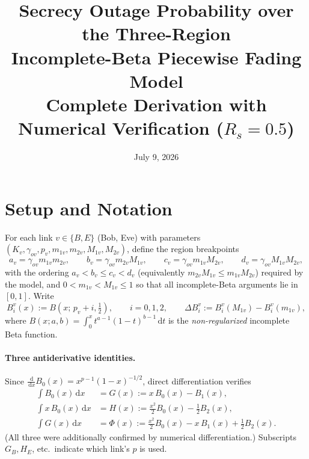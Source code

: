 \documentclass[11pt]{article}
\title{\textbf{Secrecy Outage Probability over the Three-Region\\ Incomplete-Beta Piecewise Fading Model}\\[2mm]
\large Complete Derivation with Numerical Verification ($R_s = 0.5$)}
\author{}
\date{July 9, 2026}
\newcommand{\Binc}[2]{B\!\left(#1;\,#2,\tfrac12\right)}
\newcommand{\dd}{\,\mathrm{d}}
\begin{document}
\maketitle
\vspace{-10mm}
\begin{center}
\end{center}

\section{Setup and Notation}
For each link $v\in\{B,E\}$ (Bob, Eve) with parameters $(K_v,\gamma_{ov},p_v,m_{1v},m_{2v},M_{1v},M_{2v})$, define the region breakpoints
\[
a_v=\gamma_{ov}m_{1v}m_{2v},\qquad
b_v=\gamma_{ov}m_{2v}M_{1v},\qquad
c_v=\gamma_{ov}m_{1v}M_{2v},\qquad
d_v=\gamma_{ov}M_{1v}M_{2v},
\]
with the ordering $a_v<b_v\le c_v<d_v$ (equivalently $m_{2v}M_{1v}\le m_{1v}M_{2v}$) required by the model, and $0<m_{1v}<M_{1v}\le 1$ so that all incomplete-Beta arguments lie in $[0,1]$. Write
\[
B_i^{v}(x):=\Binc{x}{p_v+i},\qquad i=0,1,2,\qquad
\Delta B_i^{v}:=B_i^{v}(M_{1v})-B_i^{v}(m_{1v}),
\]
where $B(x;a,b)=\int_0^x t^{a-1}(1-t)^{b-1}\dd t$ is the \emph{non-regularized} incomplete Beta function.

\paragraph{Three antiderivative identities.} Since $\frac{\dd}{\dd x}B_0(x)=x^{p-1}(1-x)^{-1/2}$, direct differentiation verifies
\begin{align}
\int B_0(x)\dd x &= G(x):= x\,B_0(x)-B_1(x), \label{id:G}\\
\int x\,B_0(x)\dd x &= H(x):= \tfrac{x^2}{2}B_0(x)-\tfrac12 B_2(x), \label{id:H}\\
\int G(x)\dd x &= \Phi(x):= \tfrac{x^2}{2}B_0(x)-x\,B_1(x)+\tfrac12 B_2(x). \label{id:Phi}
\end{align}
(All three were additionally confirmed by numerical differentiation.) Subscripts $G_B,H_E$, etc.\ indicate which link's $p$ is used.
\end{document}
